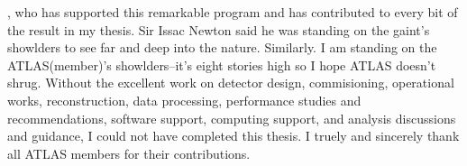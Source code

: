 


, who has supported this remarkable program and has contributed to every bit of the result in my thesis. Sir Issac Newton said he was standing on the gaint's showlders to see far and deep into the nature. Similarly. I am standing on the ATLAS(member)'s showlders--it's eight stories high so I hope ATLAS doesn't shrug. Without the excellent work on detector design, commisioning, operational works, reconstruction, data processing, performance studies and recommendations, software support, computing support, and analysis discussions and guidance, I could not have completed this thesis. I truely and sincerely thank all ATLAS members for their contributions.



